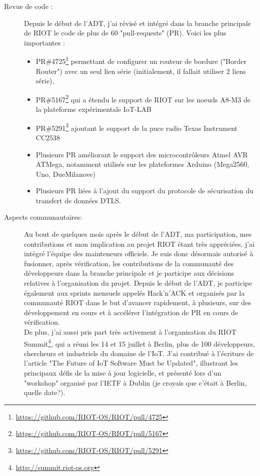 \documentclass[a4paper, twoside]{article}
\begin{document}
\begin{description}
    \item[Revue de code :] Depuis le début de l'ADT, j'ai révisé et intégré dans la
        branche principale de RIOT le code de plus de 60 "pull-requests" (PR).
        Voici les plus importantes :
        \begin{itemize}
            \item PR\#4725\footnote{\url{https://github.com/RIOT-OS/RIOT/pull/4725}} 
                permettant de configurer un routeur de bordure ("Border
                Router") avec un seul lien série (initialement, il fallait utiliser 2
                liens série),
            \item PR\#5167\footnote{\url{https://github.com/RIOT-OS/RIOT/pull/5167}} 
                qui a étendu le support de RIOT sur les noeuds A8-M3 de la
                plateforme expérimentale IoT-LAB
            \item PR\#5291\footnote{\url{https://github.com/RIOT-OS/RIOT/pull/5291}} 
                ajoutant le support de la puce radio Texas Instrument CC2538
            \item Plusieurs PR améliorant le support des microcontrôleurs Atmel AVR
                ATMega, notamment utilisés sur les plateformes Arduino (Mega2560, Uno,
                DueMilanove)
            \item Plusieurs PR liées à l'ajout du support du protocole de sécurisation du
                transfert de données DTLS.
        \end{itemize}
    \item[Aspects communautaires:]
        Au bout de quelques mois après le début de l'ADT, ma participation, mes
        contributions et mon implication au projet RIOT étant très appréciées,
        j'ai intégré l'équipe des mainteneurs officiels. Je suis donc désormais
        autorisé à fusionner, après vérification, les contributions de la
        communauté des développeurs dans la branche principale et je participe aux
        décisions relatives à l'organisation du projet.
        Depuis le début de l'ADT, je participe également aux sprints mensuels
        appelés Hack'n'ACK et organisés par la communauté RIOT dans le but
        d'avancer rapidement, à plusieurs, sur des développement en cours et à
        accélérer l'intégration de PR en cours de vérification.\\

        De plus, j'ai aussi pris part très activement à l'organisation du RIOT
        Summit\footnote{\url{http://summit.riot-os.org}}, qui a réuni les 14 et 
        15 juillet à Berlin, plus de 100
        développeurs, chercheurs et industriels du domaine de l'IoT.
        J'ai contribué à l'écriture de l'article "The Future of IoT Software Must
        be Updated"\cite{IOTSU}, illustrant les principaux défis de la mise à 
        jour logicielle,
        et présenté lors d'un "workshop" organisé par l'IETF à Dublin (je croyais
        que c'était à Berlin, quelle date?).\\


\end{description}
\end{document}
